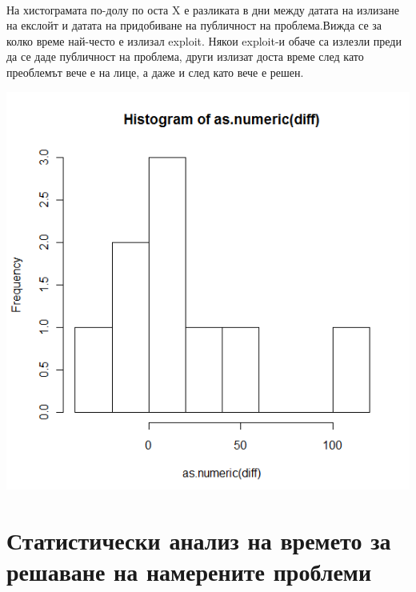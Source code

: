 \documentclass[a4paper,12pt,leqno]{article}
\begin{document}
\paragraph{}
На хистограмата по-долу по оста X е разликата в дни между датата на излизане на екслойт и датата на придобиване на публичност на проблема.Вижда се за колко време най-често е излизал exploit. Някои exploit-и обаче са излезли преди да се даде публичност на проблема, други излизат доста време след като преоблемът вече е на лице, а даже и след като вече е решен.

\includegraphics{time_for_exploit}

\newpage
\section{Статистически анализ на времето за решаване на намерените проблеми}
\paragraph{}
\end{document}

